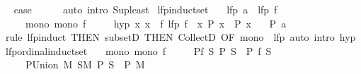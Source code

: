 \begin{isabellebody}
\ \isamarkupfalse%
\ {\isacharquery}{\kern0pt}case\isanewline
\ \ \ \ \isamarkupfalse%
\ {\isacharparenleft}{\kern0pt}auto\ intro{\isacharcolon}{\kern0pt}\ Sup{\isacharunderscore}{\kern0pt}least{\isacharparenright}{\kern0pt}\isanewline
{}\isamarkupfalse%
%
\endisatagproof
{\isafoldproof}%
%
\isadelimproof
\isanewline
%
\endisadelimproof
\isanewline
{}\isamarkupfalse%
\ lfp{\isacharunderscore}{\kern0pt}induct{\isacharunderscore}{\kern0pt}set{\isacharcolon}{\kern0pt}\isanewline
\ \ \ lfp{\isacharcolon}{\kern0pt}\ {\isachardoublequoteopen}a\ {\isasymin}\ lfp\ f{\isachardoublequoteclose}\isanewline
\ \ \ \ \ mono{\isacharcolon}{\kern0pt}\ {\isachardoublequoteopen}mono\ f{\isachardoublequoteclose}\isanewline
\ \ \ \ \ hyp{\isacharcolon}{\kern0pt}\ {\isachardoublequoteopen}{\isasymAnd}x{\isachardot}{\kern0pt}\ x\ {\isasymin}\ f\ {\isacharparenleft}{\kern0pt}lfp\ f\ {\isasyminter}\ {\isacharbraceleft}{\kern0pt}x{\isachardot}{\kern0pt}\ P\ x{\isacharbraceright}{\kern0pt}{\isacharparenright}{\kern0pt}\ {\isasymLongrightarrow}\ P\ x{\isachardoublequoteclose}\isanewline
\ \ \ {\isachardoublequoteopen}P\ a{\isachardoublequoteclose}\isanewline
%
\isadelimproof
\ \ %
\endisadelimproof
%
\isatagproof
{}\isamarkupfalse%
\ {\isacharparenleft}{\kern0pt}rule\ lfp{\isacharunderscore}{\kern0pt}induct\ {\isacharbrackleft}{\kern0pt}THEN\ subsetD{\isacharcomma}{\kern0pt}\ THEN\ CollectD{\isacharcomma}{\kern0pt}\ OF\ mono\ {\isacharunderscore}{\kern0pt}\ lfp{\isacharbrackright}{\kern0pt}{\isacharparenright}{\kern0pt}\ {\isacharparenleft}{\kern0pt}auto\ intro{\isacharcolon}{\kern0pt}\ hyp{\isacharparenright}{\kern0pt}%
\endisatagproof
{\isafoldproof}%
%
\isadelimproof
\isanewline
%
\endisadelimproof
\isanewline
{}\isamarkupfalse%
\ lfp{\isacharunderscore}{\kern0pt}ordinal{\isacharunderscore}{\kern0pt}induct{\isacharunderscore}{\kern0pt}set{\isacharcolon}{\kern0pt}\isanewline
\ \ \ mono{\isacharcolon}{\kern0pt}\ {\isachardoublequoteopen}mono\ f{\isachardoublequoteclose}\isanewline
\ \ \ \ \ P{\isacharunderscore}{\kern0pt}f{\isacharcolon}{\kern0pt}\ {\isachardoublequoteopen}{\isasymAnd}S{\isachardot}{\kern0pt}\ P\ S\ {\isasymLongrightarrow}\ P\ {\isacharparenleft}{\kern0pt}f\ S{\isacharparenright}{\kern0pt}{\isachardoublequoteclose}\isanewline
\ \ \ \ \ P{\isacharunderscore}{\kern0pt}Union{\isacharcolon}{\kern0pt}\ {\isachardoublequoteopen}{\isasymAnd}M{\isachardot}{\kern0pt}\ {\isasymforall}S{\isasymin}M{\isachardot}{\kern0pt}\ P\ S\ {\isasymLongrightarrow}\ P\ {\isacharparenleft}{\kern0pt}{\isasymUnion}M{\isacharparenright}{\kern0pt}{\isachardoublequoteclose}\isanewline

\end{isabellebody}
